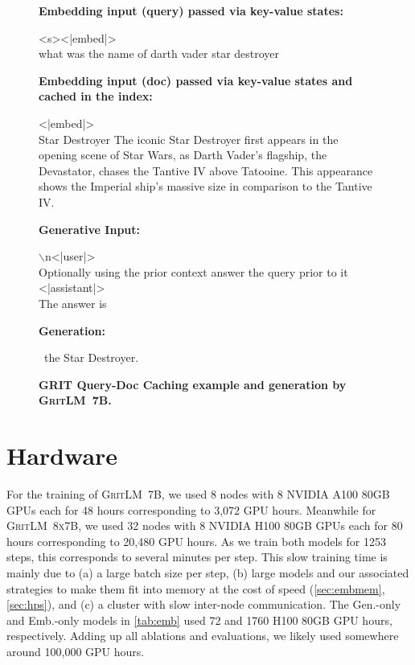 \documentclass{article}
\newcommand{\modelbase}{\textsc{GritLM~7B}}
\newcommand{\modelbig}{\textsc{GritLM~8x7B}}
\newcommand{\method}{\textsc{GRIT}}
\begin{document}
\begin{figure}[htbp]
\hrulefill

\textbf{Embedding input (query) passed via key-value states:}

\hrulefill

<s><|embed|>\\
what was the name of darth vader star destroyer

\hrulefill

\textbf{Embedding input (doc) passed via key-value states and cached in the index:}

\hrulefill

<|embed|>\\
Star Destroyer The iconic Star Destroyer first appears in the opening scene of Star Wars, as Darth Vader's flagship, the Devastator, chases the Tantive IV above Tatooine. This appearance shows the Imperial ship's massive size in comparison to the Tantive IV.

\hrulefill

\textbf{Generative Input:}

\hrulefill

$\backslash$n<|user|>\\
Optionally using the prior context answer the query prior to it\\
<|assistant|>\\
The answer is

\hrulefill

\textbf{Generation:}

\hrulefill

~the Star Destroyer.

\hrulefill

\caption{\textbf{\method{} Query-Doc Caching example and generation by \modelbase{}.}}
\label{fig:ragqd}
\end{figure}

\section{Hardware}
\label{sec:hardware}


For the training of \modelbase{}, we used 8 nodes with 8 NVIDIA A100 80GB GPUs each for 48 hours corresponding to 3,072 GPU hours. Meanwhile for \modelbig{}, we used 32 nodes with 8 NVIDIA H100 80GB GPUs each for 80 hours corresponding to 20,480 GPU hours. As we train both models for 1253 steps, this corresponds to several minutes per step. This slow training time is mainly due to (a) a large batch size per step, (b) large models and our associated strategies to make them fit into memory at the cost of speed (\autoref{sec:embmem}, \autoref{sec:hps}), and (c) a cluster with slow inter-node communication. The Gen.-only and Emb.-only models in \autoref{tab:emb} used 72 and 1760 H100 80GB GPU hours, respectively. Adding up all ablations and evaluations, we likely used somewhere around 100,000 GPU hours.
\end{document}
